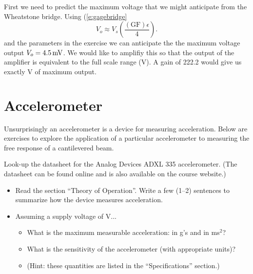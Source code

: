 \ifsolutions
\begin{soln}
First we need to predict the maximum voltage that we might anticipate from the Wheatstone bridge.  Using (\ref{e:gagebridge}
\[
V_o \approx V_s\left( \frac{(\mathrm{GF})\epsilon}{4} \right).
\]
and the parameters in the exercise we can anticipate the the maximum voltage output $V_o=\unit[4.5]{mV}$.  We would like to amplifiy this so that the output of the amplifier is equivalent to the full scale range (\unit[1]{V}).  A gain of 222.2 would give us exactly \unit[1]{V} of maximum output.
\end{soln}
\fi

\section{Accelerometer}
Unsurprisingly an accelerometer is a device for measuring acceleration.  Below are exercises to explore the application of a particular accelerometer to measuring the free response of a cantilevered beam.

\begin{ex}
Look-up the datasheet for the Analog Devices ADXL 335 accelerometer.  (The datasheet can be found online and is also available on the course website.)
\begin{itemize}
\item Read the section ``Theory of Operation''.  Write a few (1--2) sentences to summarize how the device measures acceleration.
\item Assuming a supply voltage of \unit[3]{V}...
  \begin{itemize}
  \item What is the maximum measurable acceleration: in g's and in \unit[]{m}{s$^2$}?
  \item What is the sensitivity of the accelerometer (with appropriate units)?
  \item (Hint: these quantities are listed in the ``Specifications'' section.)
  \end{itemize}
\end{itemize}
\end{ex}

\ifsolutions
\begin{soln}

\end{soln}
\fi



